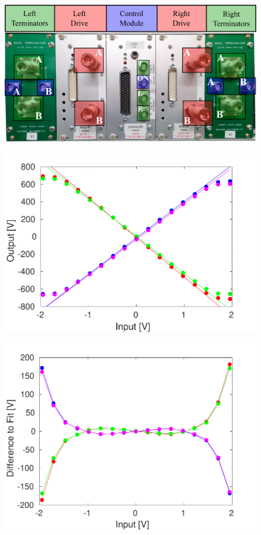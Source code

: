 \documentclass[%
 reprint,
 superscriptaddress,
 amsmath,
 amssymb,
 prstab,
]{revtex4-1}
\begin{document}
\begin{figure}
	\includegraphics[width=\textwidth]{figs/hw/AmpPanel}%
	\caption{\label{f:AmpPanel}
	}
\end{figure}

\begin{figure}
	\includegraphics[width=\columnwidth]{figs/hw/AmpOutvsDAC}%
	\caption{\label{f:AmpOutvsDAC}
	}
\end{figure}

\begin{figure}
	\includegraphics[width=\columnwidth]{figs/hw/AmpOutvsDAC_residual}%
	\caption{\label{f:AmpOutvsDAC_residual}
	}
\end{figure}
\end{document}
